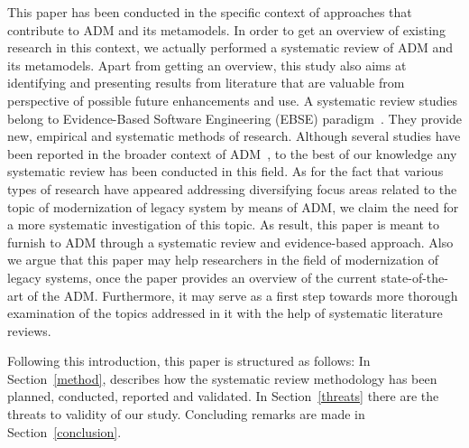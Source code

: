 This paper has been conducted in the specific context of approaches that contribute to ADM and its metamodels. In order to get an overview of existing research in this context, we actually performed a systematic review of ADM and its metamodels. Apart from getting an overview, this study also aims at identifying and presenting results from literature that are valuable from perspective of possible future enhancements and use. A systematic review studies belong to Evidence-Based Software Engineering (EBSE) paradigm~\cite{Kitchenham}. They provide new, empirical and systematic methods of research. Although several studies have been reported in the broader context of ADM~\cite{PerezCastillo20121370, SMR:SMR582, FuentesFernandez2012247, PrezCastillo2011519}, to the best of our knowledge any systematic review has been conducted in this field. As for the fact that various types of research have appeared addressing diversifying focus areas related to the topic of modernization of legacy system by means of ADM, we claim the need for a more systematic investigation of this topic. As result, this paper is meant to furnish to ADM through a systematic review and evidence-based approach. Also we argue that this paper may help researchers in the field of modernization of legacy systems, once the paper provides an overview of the current state-of-the-art of the ADM. Furthermore, it may serve as a first step towards more thorough examination of the topics addressed in it with the help of systematic literature reviews.

Following this introduction, this paper is structured as follows: In Section~\ref{method}, describes how the systematic review methodology has been planned, conducted, reported and validated. In Section~\ref{threats} there are the threats to validity of our study. Concluding remarks are made in Section~\ref{conclusion}.